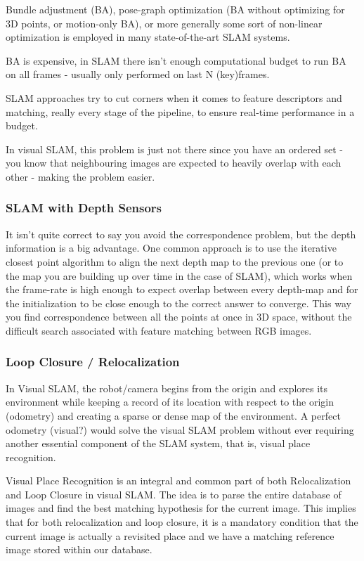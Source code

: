 Bundle adjustment (BA), pose-graph optimization (BA without optimizing for 3D points, or motion-only BA), or more generally some sort of non-linear optimization is employed in many state-of-the-art SLAM systems. 

BA is expensive, in SLAM there isn't enough computational budget to run BA on all frames - usually only performed on last N (key)frames. 

SLAM approaches try to cut corners when it comes to feature descriptors and matching, really every stage of the pipeline, to ensure real-time performance in a budget.

In visual SLAM, this problem is just not there since you have an ordered set - you know that neighbouring images are expected to heavily overlap with each other - making the problem easier.

\subsubsection{SLAM with Depth Sensors}

It isn’t quite correct to say you avoid the correspondence problem, but the depth information is a big advantage. One common approach is to use the iterative closest point algorithm to align the next depth map to the previous one (or to the map you are building up over time in the case of SLAM), which works when the frame-rate is high enough to expect overlap between every depth-map and for the initialization to be close enough to the correct answer to converge. This way you find correspondence between all the points at once in 3D space, without the difficult search associated with feature matching between RGB images.

\subsubsection{Loop Closure / Relocalization}
In Visual SLAM, the robot/camera begins from the origin and explores its environment while keeping a record of its location with respect to the origin (odometry) and creating a sparse or dense map of the environment. A perfect odometry (visual?) would solve the visual SLAM problem without ever requiring another essential component of the SLAM system, that is, visual place recognition.

Visual Place Recognition is an integral and common part of both Relocalization and Loop Closure in visual SLAM. The idea is to parse the entire database of images and find the best matching hypothesis for the current image. This implies that for both relocalization and loop closure, it is a mandatory condition that the current image is actually a revisited place and we have a matching reference image stored within our database.

